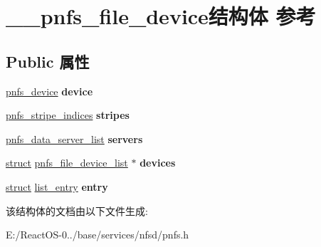 \hypertarget{struct____pnfs__file__device}{}\section{\+\_\+\+\_\+pnfs\+\_\+file\+\_\+device结构体 参考}
\label{struct____pnfs__file__device}
\subsection*{Public 属性}
\begin{DoxyCompactItemize}
\item 
\mbox{\label{struct____pnfs__file__device_aa374b10d78aa89c3e5165a086d12ba41}} 
\hyperlink{struct____pnfs__device}{pnfs\+\_\+device} {\bfseries device}
\item 
\mbox{\label{struct____pnfs__file__device_aa28fb368be8a422caa0f5888a641be9d}} 
\hyperlink{struct____pnfs__stripe__indices}{pnfs\+\_\+stripe\+\_\+indices} {\bfseries stripes}
\item 
\mbox{\label{struct____pnfs__file__device_ab4d51a83c96c11e605fdfae54bf0e421}} 
\hyperlink{struct____pnfs__data__server__list}{pnfs\+\_\+data\+\_\+server\+\_\+list} {\bfseries servers}
\item 
\mbox{\label{struct____pnfs__file__device_a3d3ff0ce93a43670a01dc859b59c6160}} 
\hyperlink{interfacestruct}{struct} \hyperlink{structpnfs__file__device__list}{pnfs\+\_\+file\+\_\+device\+\_\+list} $\ast$ {\bfseries devices}
\item 
\mbox{\label{struct____pnfs__file__device_aee8d6381a1a78db58c30d6e55d561149}} 
\hyperlink{interfacestruct}{struct} \hyperlink{structlist__entry}{list\+\_\+entry} {\bfseries entry}
\end{DoxyCompactItemize}


该结构体的文档由以下文件生成\+:\begin{DoxyCompactItemize}
\item 
E\+:/\+React\+O\+S-\/0../base/services/nfsd/pnfs.\+h\end{DoxyCompactItemize}
